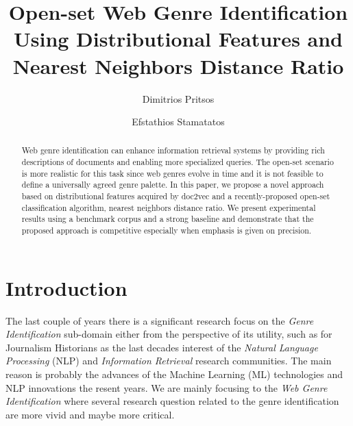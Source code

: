 \documentclass[runningheads]{llncs}
\begin{document}
\title{Open-set Web Genre Identification Using Distributional Features and Nearest Neighbors Distance Ratio}

\author{Dimitrios Pritsos \and Efstathios Stamatatos }


\maketitle

\begin{abstract}
Web genre identification can enhance information retrieval systems by providing rich descriptions of documents and enabling more specialized queries. The open-set scenario is more realistic for this task since web genres evolve in time and it is not feasible to define a universally agreed genre palette. In this paper, we propose a novel approach based on distributional features acquired by doc2vec and a recently-proposed open-set classification algorithm, nearest neighbors distance ratio. We present experimental results using a benchmark corpus and a strong baseline and demonstrate that the proposed approach is competitive especially when emphasis is given on precision.

\end{abstract}


\section{Introduction}\label{sec:intro}

The last couple of years there is a significant research focus on the \textit{Genre Identification} sub-domain either from the perspective of its utility, such as for Journalism Historians as the last decades interest of the \textit{Natural Language Processing} (NLP) and \textit{Information Retrieval} research communities. The main reason is probably the advances of the Machine Learning (ML) technologies and NLP innovations the resent years. We are mainly focusing to the \textit{Web Genre Identification} where several research question related to the  genre identification are more vivid and maybe more critical.
\end{document}
